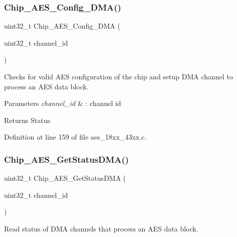 \subsubsection{\texorpdfstring{Chip\+\_\+\+A\+E\+S\+\_\+\+Config\+\_\+\+D\+M\+A()}{Chip\_AES\_Config\_DMA()}}
{\footnotesize\ttfamily uint32\+\_\+t Chip\+\_\+\+A\+E\+S\+\_\+\+Config\+\_\+\+D\+MA (\begin{DoxyParamCaption}\item[{uint32\+\_\+t}]{channel\+\_\+id }\end{DoxyParamCaption})}



Checks for valid A\+ES configuration of the chip and setup D\+MA channel to process an A\+ES data block. 


\begin{DoxyParams}{Parameters}
{\em channel\+\_\+id} & \+: channel id \\
\hline
\end{DoxyParams}
\begin{DoxyReturn}{Returns}
Status 
\end{DoxyReturn}


Definition at line 159 of file aes\+\_\+18xx\+\_\+43xx.\+c.

\mbox{\label{group___a_e_s__18_x_x__43_x_x_gabc7a95a818dfe7de0ffd09a40a63ffb2}} 
\subsubsection{\texorpdfstring{Chip\+\_\+\+A\+E\+S\+\_\+\+Get\+Status\+D\+M\+A()}{Chip\_AES\_GetStatusDMA()}}
{\footnotesize\ttfamily uint32\+\_\+t Chip\+\_\+\+A\+E\+S\+\_\+\+Get\+Status\+D\+MA (\begin{DoxyParamCaption}\item[{uint32\+\_\+t}]{channel\+\_\+id }\end{DoxyParamCaption})}



Read status of D\+MA channels that process an A\+ES data block. 


